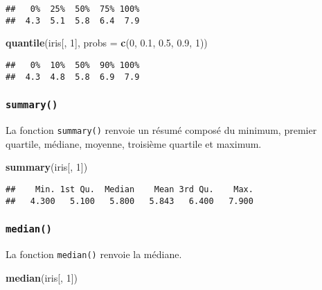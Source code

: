 \documentclass[]{book}
\newenvironment{Shaded}{\begin{snugshade}}{\end{snugshade}}
\newcommand{\KeywordTok}[1]{\textcolor[rgb]{0.13,0.29,0.53}{\textbf{#1}}}
\newcommand{\DataTypeTok}[1]{\textcolor[rgb]{0.13,0.29,0.53}{#1}}
\newcommand{\DecValTok}[1]{\textcolor[rgb]{0.00,0.00,0.81}{#1}}
\newcommand{\FloatTok}[1]{\textcolor[rgb]{0.00,0.00,0.81}{#1}}
\newcommand{\NormalTok}[1]{#1}
\theoremstyle{definition}
\theoremstyle{definition}
\theoremstyle{definition}
\theoremstyle{remark}
\begin{document}
\begin{verbatim}
##   0%  25%  50%  75% 100% 
##  4.3  5.1  5.8  6.4  7.9
\end{verbatim}

\begin{Shaded}
\begin{Highlighting}[]
\KeywordTok{quantile}\NormalTok{(iris[, }\DecValTok{1}\NormalTok{], }\DataTypeTok{probs =} \KeywordTok{c}\NormalTok{(}\DecValTok{0}\NormalTok{, }\FloatTok{0.1}\NormalTok{, }\FloatTok{0.5}\NormalTok{, }\FloatTok{0.9}\NormalTok{, }\DecValTok{1}\NormalTok{))}
\end{Highlighting}
\end{Shaded}

\begin{verbatim}
##   0%  10%  50%  90% 100% 
##  4.3  4.8  5.8  6.9  7.9
\end{verbatim}

\subsubsection{\texorpdfstring{\texttt{summary()}}{summary()}}\label{l015summary}

La fonction \texttt{summary()} renvoie un résumé composé du minimum,
premier quartile, médiane, moyenne, troisième quartile et maximum.

\begin{Shaded}
\begin{Highlighting}[]
\KeywordTok{summary}\NormalTok{(iris[, }\DecValTok{1}\NormalTok{])}
\end{Highlighting}
\end{Shaded}

\begin{verbatim}
##    Min. 1st Qu.  Median    Mean 3rd Qu.    Max. 
##   4.300   5.100   5.800   5.843   6.400   7.900
\end{verbatim}

\subsubsection{\texorpdfstring{\texttt{median()}}{median()}}\label{l015median}

La fonction \texttt{median()} renvoie la médiane.

\begin{Shaded}
\begin{Highlighting}[]
\KeywordTok{median}\NormalTok{(iris[, }\DecValTok{1}\NormalTok{])}
\end{Highlighting}
\end{Shaded}
\end{document}
